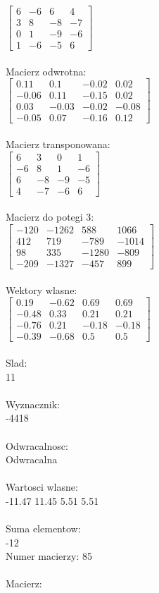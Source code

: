 \documentclass[a4paper,12pt]{article}
\begin{document}
$\begin{bmatrix} 6&-6&6&4\\3&8&-8&-7\\0&1&-9&-6\\1&-6&-5&6 \end{bmatrix}$
\\
\\
Macierz odwrotna:\\

$\begin{bmatrix} 0.11&0.1&-0.02&0.02\\-0.06&0.11&-0.15&0.02\\0.03&-0.03&-0.02&-0.08\\-0.05&0.07&-0.16&0.12 \end{bmatrix}$
\\
\\
Macierz transponowana:\\

$\begin{bmatrix} 6&3&0&1\\-6&8&1&-6\\6&-8&-9&-5\\4&-7&-6&6 \end{bmatrix}$
\\
\\
Macierz do potegi 3:\\

$\begin{bmatrix} -120&-1262&588&1066\\412&719&-789&-1014\\98&335&-1280&-809\\-209&-1327&-457&899 \end{bmatrix}$
\\
\\
Wektory wlasne:\\

$\begin{bmatrix} 0.19&-0.62&0.69&0.69\\-0.48&0.33&0.21&0.21\\-0.76&0.21&-0.18&-0.18\\-0.39&-0.68&0.5&0.5 \end{bmatrix}$
\\
\\
Slad:\\
11
\\
\\
Wyznacznik:\\
-4418
\\
\\
Odwracalnosc:\\
Odwracalna
\\
\\
Wartosci wlasne:\\
-11.47 11.45 5.51 5.51
\\
\\
Suma elementow:\\
-12
\\
\newpage
Numer macierzy:
85
\\
\\
Macierz:\\
\end{document}
